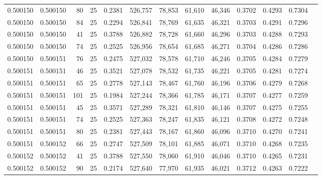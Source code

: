 \begin{tabular}{rrrrrrrrrrrrr}
0.500150 & 0.500150 &    80 &  25 &                                     0.2381 & 526,757 &  78,853 &  61,610 &  46,346 & 0.3702 & 0.4293 & 0.7304 \\
0.500150 & 0.500150 &    84 &  25 &                                     0.2294 & 526,841 &  78,769 &  61,635 &  46,321 & 0.3703 & 0.4291 & 0.7296 \\
0.500150 & 0.500150 &    41 &  25 &                                     0.3788 & 526,882 &  78,728 &  61,660 &  46,296 & 0.3703 & 0.4288 & 0.7293 \\
0.500150 & 0.500150 &    74 &  25 &                                     0.2525 & 526,956 &  78,654 &  61,685 &  46,271 & 0.3704 & 0.4286 & 0.7286 \\
0.500150 & 0.500151 &    76 &  25 &                                     0.2475 & 527,032 &  78,578 &  61,710 &  46,246 & 0.3705 & 0.4284 & 0.7279 \\
0.500151 & 0.500151 &    46 &  25 &                                     0.3521 & 527,078 &  78,532 &  61,735 &  46,221 & 0.3705 & 0.4281 & 0.7274 \\
0.500151 & 0.500151 &    65 &  25 &                                     0.2778 & 527,143 &  78,467 &  61,760 &  46,196 & 0.3706 & 0.4279 & 0.7268 \\
0.500151 & 0.500151 &   101 &  25 &                                     0.1984 & 527,244 &  78,366 &  61,785 &  46,171 & 0.3707 & 0.4277 & 0.7259 \\
0.500151 & 0.500151 &    45 &  25 &                                     0.3571 & 527,289 &  78,321 &  61,810 &  46,146 & 0.3707 & 0.4275 & 0.7255 \\
0.500151 & 0.500151 &    74 &  25 &                                     0.2525 & 527,363 &  78,247 &  61,835 &  46,121 & 0.3708 & 0.4272 & 0.7248 \\
0.500151 & 0.500151 &    80 &  25 &                                     0.2381 & 527,443 &  78,167 &  61,860 &  46,096 & 0.3710 & 0.4270 & 0.7241 \\
0.500151 & 0.500152 &    66 &  25 &                                     0.2747 & 527,509 &  78,101 &  61,885 &  46,071 & 0.3710 & 0.4268 & 0.7235 \\
0.500152 & 0.500152 &    41 &  25 &                                     0.3788 & 527,550 &  78,060 &  61,910 &  46,046 & 0.3710 & 0.4265 & 0.7231 \\
0.500152 & 0.500152 &    90 &  25 &                                     0.2174 & 527,640 &  77,970 &  61,935 &  46,021 & 0.3712 & 0.4263 & 0.7222 \\

\end{tabular}
